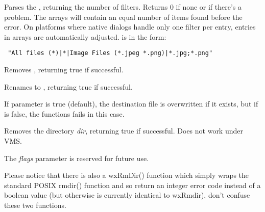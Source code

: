 \label{wxparsecommondialogsfilter}


Parses the , returning the number of filters.
Returns 0 if none or if there's a problem.
The arrays will contain an equal number of items found before the error.
On platforms where native dialogs handle only one filter per entry,
entries in arrays are automatically adjusted.
 is in the form:
\begin{verbatim}
 "All files (*)|*|Image Files (*.jpeg *.png)|*.jpg;*.png"
\end{verbatim}

\label{wxremovefile}


Removes , returning true if successful.


\label{wxrenamefile}


Renames  to , returning true if successful.

If  parameter is true (default), the destination file is
overwritten if it exists, but if  is false, the functions fails
in this case.


\label{wxrmdir}


Removes the directory {\it dir}, returning true if successful. Does not work under VMS.

The {\it flags} parameter is reserved for future use.

Please notice that there is also a wxRmDir() function which simply wraps the
standard POSIX rmdir() function and so return an integer error code instead of
a boolean value (but otherwise is currently identical to wxRmdir), don't
confuse these two functions.


\label{wxsetworkingdirectory}



